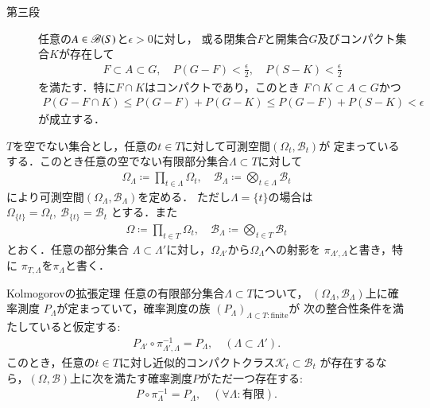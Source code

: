 \begin{prf}
\begin{description}
			\item[第三段]
				任意の$A \in \mathscr{B}(S)$と$\epsilon > 0$に対し，
				或る閉集合$F$と開集合$G$及びコンパクト集合$K$が存在して
				\begin{align}
					F \subset A \subset G,
					\quad P(G - F) < \frac{\epsilon}{2},
					\quad P(S - K) < \frac{\epsilon}{2}
				\end{align}
				を満たす．特に$F \cap K$はコンパクトであり，このとき
				$F \cap K \subset A \subset G$かつ
				\begin{align}
					P(G - F \cap K)
					\leq P(G - F) + P(G - K)
					\leq P(G - F) + P(S - K)
					< \epsilon
				\end{align}
				が成立する．
				\QED
		\end{description}
	\end{prf}
	
	$T$を空でない集合とし，任意の$t \in T$に対して可測空間$(\Omega_t,\mathscr{B}_t)$が
	定まっているする．このとき任意の空でない有限部分集合$\Lambda \subset T$に対して
	\begin{align}
		\Omega_\Lambda \coloneqq \prod_{t \in \Lambda} \Omega_t,
		\quad \mathscr{B}_\Lambda \coloneqq \bigotimes_{t \in \Lambda} \mathscr{B}_t
	\end{align}
	により可測空間$(\Omega_\Lambda,\mathscr{B}_\Lambda)$を定める．
	ただし$\Lambda = \{t\}$の場合は$\Omega_{\{t\}} = \Omega_t,\ \mathscr{B}_{\{t\}} = \mathscr{B}_t$
	とする．また
	\begin{align}
		\Omega \coloneqq \prod_{t \in T} \Omega_t,
		\quad \mathscr{B}_\Lambda \coloneqq \bigotimes_{t \in T} \mathscr{B}_t
	\end{align}
	とおく．任意の部分集合
	$\Lambda \subset \Lambda'$に対し，$\Omega_{\Lambda'}$から$\Omega_{\Lambda}$への射影を
	$\pi_{\Lambda',\Lambda}$と書き，特に
	$\pi_{T,\Lambda}$を$\pi_{\Lambda}$と書く．
	
	\begin{itembox}[l]{Kolmogorovの拡張定理}
		任意の有限部分集合$\Lambda \subset T$について，
		$(\Omega_\Lambda,\mathscr{B}_\Lambda)$上に確率測度
		$P_\Lambda$が定まっていて，確率測度の族
		$(P_\Lambda)_{\Lambda \subset T:\mathrm{finite}}$が
		次の整合性条件を満たしていると仮定する:
		\begin{align}
			P_{\Lambda'} \circ \pi_{\Lambda',\Lambda}^{-1}
			= P_{\Lambda},
			\quad (\Lambda \subset \Lambda').
		\end{align}
		このとき，任意の$t \in T$に対し近似的コンパクトクラス$\mathcal{K}_t \subset \mathscr{B}_t$
		が存在するなら，$(\Omega,\mathscr{B})$上に次を満たす確率測度$P$がただ一つ存在する:
		\begin{align}
			P \circ \pi_{\Lambda}^{-1} = P_{\Lambda},
			\quad (\forall \Lambda:\mbox{有限}).
		\end{align}
	\end{itembox}
	
